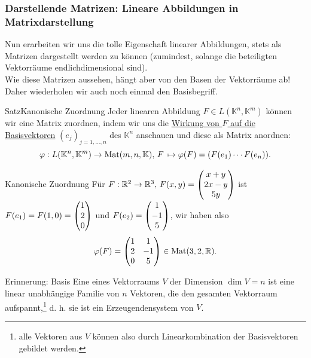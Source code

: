 \subsubsection{Darstellende Matrizen: Lineare Abbildungen in Matrixdarstellung}
Nun erarbeiten wir uns die tolle Eigenschaft linearer Abbildungen, stets als Matrizen dargestellt werden zu können (zumindest, solange die beteiligten Vektorräume endlichdimensional sind).\\
Wie diese Matrizen aussehen, hängt aber von den Basen der Vektorräume ab! Daher wiederholen wir auch noch einmal den Basisbegriff.
\begin{Satz}
{Satz}{Kanonische Zuordnung}
Jeder linearen Abbildung $F\in L(\mathbb{K}^n,\mathbb{K}^m)$ können wir eine Matrix zuordnen, indem wir uns die \underline{Wirkung von $F$ auf die Basisvektoren} $(e_j)_{j=1,...,n}$ des $\mathbb{K}^n$ anschauen und diese als Matrix anordnen:
\begin{equation*}
    \varphi:L(\mathbb{K}^n,\mathbb{K}^m)\to \text{Mat}(m,n,\mathbb{K}),\, F\,\mapsto \varphi(F)=(F(e_1)\cdots F(e_n)).
\end{equation*}
\end{Satz}
\begin{Beispiel}{Kanonische Zuordnung}
Für $F:\mathbb{R}^2\to\mathbb{R}^3,\, F(x,y)=\begin{pmatrix}x+y\\2x-y\\5y\end{pmatrix}$ ist $F(e_1)=F(1,0)=\begin{pmatrix}1\\2\\0\end{pmatrix}$ und $F(e_2)=\begin{pmatrix}1\\-1\\5\end{pmatrix}$, wir haben also
\begin{equation*}
    \varphi(F)=\begin{pmatrix}1&1\\2&-1\\0&5\end{pmatrix}\in\text{Mat}(3,2,\mathbb{R}).
\end{equation*}
\end{Beispiel}
\begin{Def}
{Erinnerung: Basis}
Eine  eines Vektorraums $V$ der Dimension $\dim V= n$ ist eine linear unabhängige Familie von $n$ Vektoren, die den gesamten Vektorraum aufspannt,\footnote{alle Vektoren aus $V$ können also durch Linearkombination der Basisvektoren gebildet werden.} d. h. sie ist ein Erzeugendensystem von $V$.
\end{Def}
